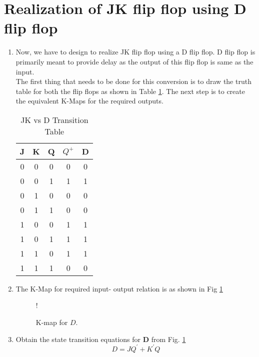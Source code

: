 \documentclass[journal,12pt,twocolumn]{IEEEtran}
\begin{document}
\section{\textbf{Realization of JK flip flop using D flip flop}}
%
\begin{enumerate}[1.]

 

\item Now, we have to design to realize JK flip flop using a D flip flop. D flip flop is primarily meant to provide delay as the output of this flip flop is same as the input. \\

The first thing that needs to be done for this conversion is to draw the truth table for both the flip flops as shown in Table \ref{table:JKD_table}. The next step is to create the equivalent K-Maps for the required outputs. \\

\begin{table}[h!]
	\begin{center}
		\begin{tabular}{ |c|c|c|c|c| } 
			\hline
	J & K & Q & $Q^{+}$ & D \\
			\hline
			0 & 0 & 0 & 0 & 0 \\ 
			\hline
			0 & 0 & 1 & 1 & 1 \\ 
			\hline
			0 & 1 & 0 & 0 & 0 \\ 
			\hline
			0 & 1 & 1 & 0 & 0 \\
			\hline
			1 & 0 & 0 & 1 & 1 \\
			\hline
			1 & 0 & 1 &1 & 1 \\
			\hline
			1 & 1 & 0 & 1 & 1 \\
			\hline
			1 & 1 & 1 & 0 & 0 \\
			\hline
		\end{tabular}
		\caption{JK vs D Transition Table}
		\label{table:JKD_table}
	\end{center}
\end{table}

\item The K-Map for required input- output relation is as shown in Fig \ref{fig:kmap_a}

\begin{figure}[!h]
	\resizebox {\columnwidth} {!} {
		
	}
	\caption{K-map for $D$.}
	\label{fig:kmap_a}
\end{figure}

\item Obtain the state transition equations for \textbf{D} from Fig. \ref{fig:kmap_a}
\begin{equation} \label{eq:5}
	D = JQ^{\prime}+K^{\prime}Q
\end{equation}

\end{enumerate}
\end{document}
